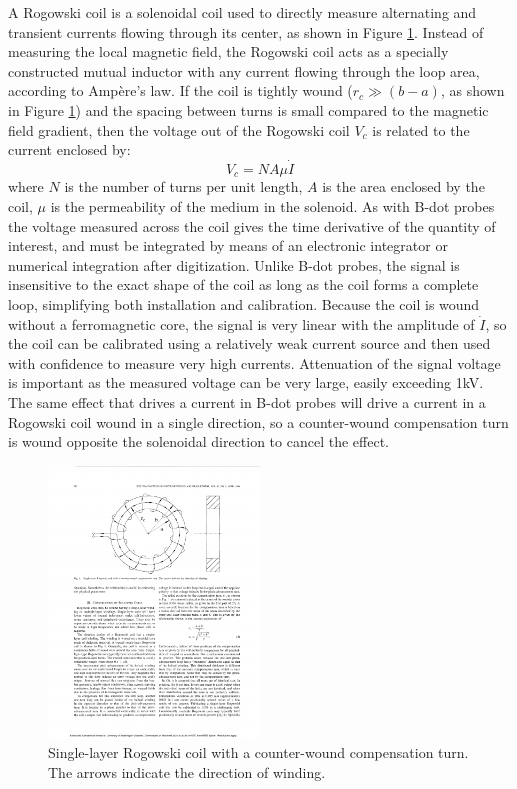 \documentclass{jpp}
\begin{document}
A Rogowski coil is a solenoidal coil used to directly measure alternating and transient currents flowing through its center, as shown in Figure \ref{fig:rogowski}. Instead of measuring the local magnetic field, the Rogowski coil acts as a specially constructed mutual inductor with any current flowing through the loop area, according to Ampère's law. If the coil is tightly wound ($r_c \gg (b - a)$, as shown in Figure \ref{fig:rogowski}) and the spacing between turns is small compared to the magnetic field gradient, then the voltage out of the Rogowski coil $V_c$ is related to the current enclosed by:
\begin{equation*}
V_c = N A \mu \dot I
\end{equation*}
where $N$ is the number of turns per unit length, $A$ is the area enclosed by the coil, $\mu$ is the permeability of the medium in the solenoid. As with B-dot probes the voltage measured across the coil gives the time derivative of the quantity of interest, and must be integrated by means of an electronic integrator or numerical integration after digitization. Unlike B-dot probes, the signal is insensitive to the exact shape of the coil as long as the coil forms a complete loop, simplifying both installation and calibration. Because the coil is wound without a ferromagnetic core, the signal is very linear with the amplitude of $\dot{I}$, so the coil can be calibrated using a relatively weak current source and then used with confidence to measure very high currents. Attenuation of the signal voltage is important as the measured voltage can be very large, easily exceeding 1kV. The same effect that drives a current in B-dot probes will drive a current in a Rogowski coil wound in a single direction, so a counter-wound compensation turn is wound opposite the solenoidal direction to cancel the effect.

\begin{figure}
  \centering
  \includegraphics[width=0.5\textwidth]{rogowski.pdf}%
  \caption{Single-layer Rogowski coil with a counter-wound compensation turn. The arrows indicate the direction of winding. \citep{492777}}
\label{fig:rogowski}
\end{figure}
\end{document}
